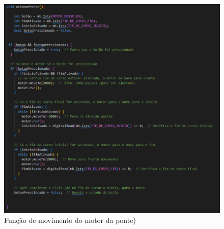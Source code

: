 \begin{anexosenv}
\begin{figure}[h]
	\centering
	\label{fig:codigo_pt03}
		\includegraphics[keepaspectratio=true,scale=0.6]{figuras/codigo_pt3.png}
	\caption{Função de movimento do motor da ponte)}
\end{figure}


\end{anexosenv}
